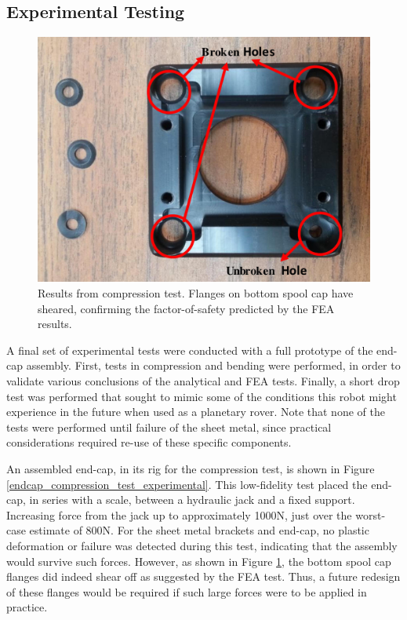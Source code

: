 \documentclass[12pt]{report}
\begin{document}

\subsection{Experimental Testing}

\begin{figure}
   \vspace{-0.5cm}
   \centering
   \includegraphics[width=0.40\columnwidth]{img/bottom_spool_cap_failure.jpg} 
   \caption{Results from compression test. Flanges on bottom spool cap have sheared, confirming the factor-of-safety predicted by the FEA results.}
   \label{broken_bottom_spool_cap}
   \vspace{-0.5cm}
\end{figure}

A final set of experimental tests were conducted with a full prototype of the end-cap assembly.
First, tests in compression and bending were performed, in order to validate various conclusions of the analytical and FEA tests.
Finally, a short drop test was performed that sought to mimic some of the conditions this robot might experience in the future when used as a planetary rover.
Note that none of the tests were performed until failure of the sheet metal, since practical considerations required re-use of these specific components.

An assembled end-cap, in its rig for the compression test, is shown in Figure \ref{endcap_compression_test_experimental}.
This low-fidelity test placed the end-cap, in series with a scale, between a hydraulic jack and a fixed support.
Increasing force from the jack up to approximately 1000N, just over the worst-case estimate of 800N.
For the sheet metal brackets and end-cap, no plastic deformation or failure was detected during this test, indicating that the assembly would survive such forces.
However, as shown in Figure \ref{broken_bottom_spool_cap}, the bottom spool cap flanges did indeed shear off as suggested by the FEA test.
Thus, a future redesign of these flanges would be required if such large forces were to be applied in practice.
\end{document}
